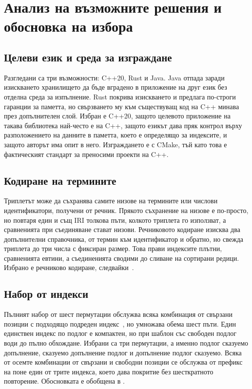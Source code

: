 \section{Анализ на възможните решения и обосновка на избора}
\label{sec:alternatives}

\subsection{Целеви език и среда за изграждане}

Разгледани са три възможности: C++20, Rust и Java. Java отпада заради изискването
хранилището да бъде вградено в приложение на друг език без отделна среда за
изпълнение. Rust покрива изискването и предлага по-строги гаранции за паметта, но
свързването му към съществуващ код на C++ минава през допълнителен слой. Избран е
C++20, защото целевото приложение на такава библиотека най-често е на C++, защото
езикът дава пряк контрол върху разположението на данните в паметта, което е
определящо за индексите, и защото авторът има опит в него. Изграждането е с CMake,
тъй като това е фактическият стандарт за преносими проекти на C++.

\subsection{Кодиране на термините}

Триплетът може да съхранява самите низове на термините или числови идентификатори,
получени от речник. Прякото съхранение на низове е по-просто, но повтаря един и същ
IRI толкова пъти, колкото триплета го използват, а сравненията при съединяване стават
низови. Речниковото кодиране изисква два допълнителни справочника, от термин към
идентификатор и обратно, но свежда триплета до три числа с фиксиран размер. Това
прави индексите плътни, сравненията евтини, а съединенията сводими до сливане на
сортирани редици. Избрано е речниково кодиране, следвайки~\cite{neumann2010rdf3x}.

\subsection{Набор от индекси}

Пълният набор от шест пермутации обслужва всяка комбинация от свързани позиции с
подходящо подреден индекс~\cite{weiss2008hexastore}, но умножава обема шест пъти.
Един единствен индекс по подлог е компактен, но при шаблон със свободен подлог води
до пълно обхождане. Избрани са три пермутации, а именно подлог сказуемо допълнение,
сказуемо допълнение подлог и допълнение подлог сказуемо. Всяка от осемте комбинации
от свързани и свободни позиции се обслужва от префикс на поне един от трите индекса,
което дава покритие без шесткратното повторение. Обосновката е обобщена в
.

